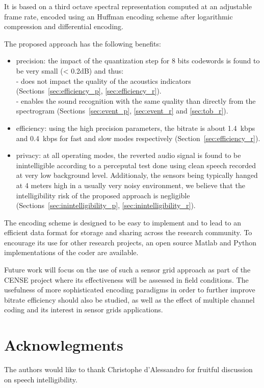 \documentclass[sensors,article,submit,moreauthors,pdftex,10pt,a4paper]{mdpi}
\begin{document}
It is based on a third octave spectral representation computed at an adjustable frame rate, encoded using an Huffman encoding scheme after logarithmic compression and differential encoding.

The proposed approach has the following benefits:
\begin{itemize}
	\item precision: the impact of the quantization step for 8 bits codewords is found to be very small (< 0.2dB) and thus:\\
	- does not impact the quality of the acoustics indicators (Sections~\ref{sec:efficiency_p}, \ref{sec:efficiency_r}).\\
	- enables the sound recognition with the same quality than directly from the spectrogram (Sections~\ref{sec:event_p}, \ref{sec:event_r} and \ref{sec:tob_r}).
	\item efficiency: using the high precision parameters, the bitrate is about 1.4~kbps and 0.4~kbps for fast and slow modes respectively (Section~\ref{sec:efficiency_r}).
	\item privacy: at all operating modes, the reverted audio signal is found to be inintelligible according to a perceputal test done using clean speech recorded at very low background level. Additionaly, the sensors being typically hanged at 4 meters high in a usually very noisy environment, we believe that the intelligibility risk of the proposed approach is negligible (Sections~\ref{sec:inintelligibility_p}, \ref{sec:inintelligibility_r}).
\end{itemize}

The encoding scheme is designed to be easy to implement and to lead to an efficient data format for storage and sharing across the research community. To encourage its use for other research projects, an open source Matlab and Python implementations of the coder are available.

Future work will focus on the use of such a sensor grid approach as part of the CENSE project where its effectiveness will be assessed in field conditions. The usefulness of more sophisticated encoding paradigms in order to further improve bitrate efficiency should also be studied, as well as the effect of multiple channel coding and its interest in sensor grids applications.

\section{Acknowlegments}

The authors would like to thank Christophe d'Alessandro for fruitful discussion on speech intelligibility.

%


\end{document}
